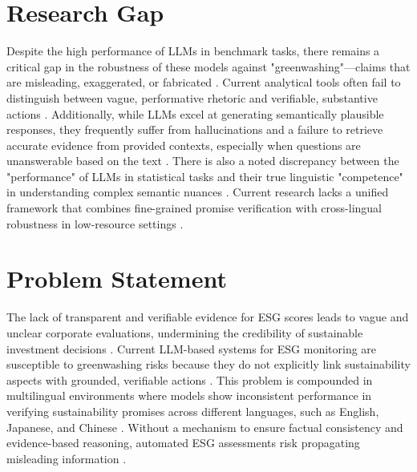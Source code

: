 \documentclass{article}
\begin{document}
\section{Research Gap}
Despite the high performance of LLMs in benchmark tasks, there remains a critical gap in the robustness of these models against "greenwashing"—claims that are misleading, exaggerated, or fabricated \citep{Towards Robust ESG Analysis Against Greenwashing Risks: Aspect-Action Analysis with Cross-Category Generalization}. Current analytical tools often fail to distinguish between vague, performative rhetoric and verifiable, substantive actions \citep{Towards Robust ESG Analysis Against Greenwashing Risks: Aspect-Action Analysis with Cross-Category Generalization}. Additionally, while LLMs excel at generating semantically plausible responses, they frequently suffer from hallucinations and a failure to retrieve accurate evidence from provided contexts, especially when questions are unanswerable based on the text \citep{Is the Answer in the Text? Challenging ChatGPT with Evidence Retrieval from Instructive Text}. There is also a noted discrepancy between the "performance" of LLMs in statistical tasks and their true linguistic "competence" in understanding complex semantic nuances \citep{Large Language Models as Neurolinguistic Subjects: Discrepancy between Performance and Competence}. Current research lacks a unified framework that combines fine-grained promise verification with cross-lingual robustness in low-resource settings \citep{Multilingual Promise Verification in ESG Reports with Large Language Model Performance Evaluation, A low resource framework for Multi-lingual ESG Impact Type Identification}.

\section{Problem Statement}
The lack of transparent and verifiable evidence for ESG scores leads to vague and unclear corporate evaluations, undermining the credibility of sustainable investment decisions \citep{Textual Evidence Extraction for ESG Scores}. Current LLM-based systems for ESG monitoring are susceptible to greenwashing risks because they do not explicitly link sustainability aspects with grounded, verifiable actions \citep{Towards Robust ESG Analysis Against Greenwashing Risks: Aspect-Action Analysis with Cross-Category Generalization}. This problem is compounded in multilingual environments where models show inconsistent performance in verifying sustainability promises across different languages, such as English, Japanese, and Chinese \citep{Multilingual Promise Verification in ESG Reports with Large Language Model Performance Evaluation}. Without a mechanism to ensure factual consistency and evidence-based reasoning, automated ESG assessments risk propagating misleading information \citep{Improving Factual Consistency Between a Response and Persona Facts, Is the Answer in the Text? Challenging ChatGPT with Evidence Retrieval from Instructive Text}.
\end{document}

